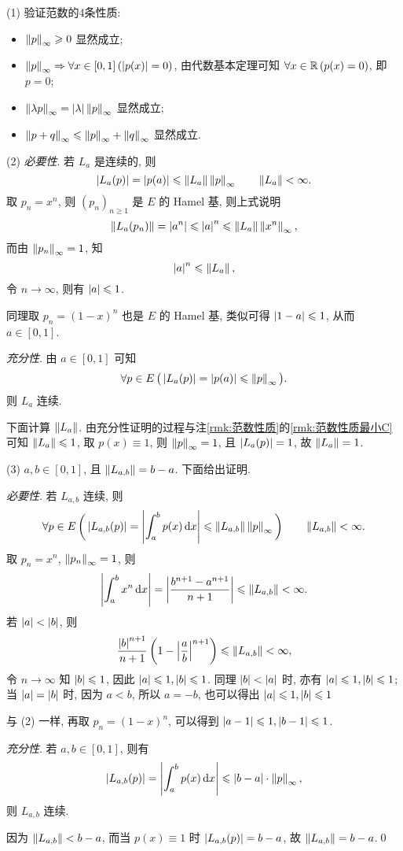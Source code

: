	\begin{Proof}
		(1) 验证范数的4条性质:
		\begin{itemize}
			\item $ \left\| p \right\|_{\infty}\geqslant 0 $ 显然成立;
			\item $ \left\| p \right\|_{\infty}\Rightarrow \forall x\in [0, 1]\,(\left| p(x) \right| =0) $, 由代数基本定理可知 $ \forall x\in\mathbb{R}\,(p(x)=0) $, 即 $ p=0 $;
			\item $ \left\| \lambda p \right\|_{\infty}=\left| \lambda \right| \left\| p \right\|_{\infty} $ 显然成立;
			\item $ \left\| p+q \right\|_{\infty}\leqslant\left\| p \right\|_{\infty}+\left\| q \right\|_{\infty} $ 显然成立.
		\end{itemize}

		(2) \textsl{必要性}. 若 $ L_{a} $ 是连续的, 则
		\[
			\left| L_{a}(p) \right| =\left| p(a) \right| \leqslant \left\| L_{a} \right\|\left\| p \right\|_{\infty}\qquad\left\| L_{a} \right\|<\infty.
		\]
		取 $ p_{n}=x^{n} $, 则 $ (p_{n})_{n\geqslant 1} $ 是 $ E $ 的 Hamel 基, 则上式说明
		\[
			\left\| L_{a}(p_{n}) \right\|=\left| a^{n} \right| \leqslant\left| a \right| ^{n}\leqslant \left\| L_{a} \right\|\left\| x^{n} \right\|_{\infty},
		\]
		而由 $ \left\| p_{n} \right\|_{\infty}=1 $, 知
		\[
			\left| a \right| ^{n}\leqslant\left\| L_{a} \right\|,
		\]
		令 $ n\to\infty $, 则有 $ \left| a \right| \leqslant1 $. 

		同理取 $ p_{n}=(1-x)^{n} $ 也是 $ E $ 的 Hamel 基, 类似可得 $ \left| 1-a \right| \leqslant1 $, 从而 $ a\in[0, 1] $.

		\textsl{充分性}. 由 $ a\in[0, 1] $ 可知
		\[
			\forall p\in E\,\big(\left| L_{a}(p) \right| =\left| p(a) \right| \leqslant\left\| p \right\|_{\infty}\big).
		\]
		则 $ L_{a} $ 连续.

		下面计算 $ \left\| L_{a} \right\| $. 由充分性证明的过程与注\ref{rmk:范数性质}的\ref{rmk:范数性质最小C}可知 $ \left\| L_{a} \right\|\leqslant1 $, 取 $ p(x)\equiv 1 $, 则 $ \left\| p \right\|_{\infty}=1 $, 且 $ \left| L_{a}(p) \right| =1 $, 故 $ \left\| L_{a} \right\|=1 $.

		(3) $ a, b\in[0, 1] $, 且 $ \left\| L_{a, b} \right\|=b-a $. 下面给出证明.

		\textsl{必要性}. 若 $ L_{a, b} $ 连续, 则
		\[
			\forall p\in E\,\bigg(\left| L_{a, b}(p) \right| =\left| \displaystyle\int_{a}^{b}p(x)\,\mathrm{d} x \right| \leqslant \left\| L_{a, b} \right\|\left\| p \right\|_{\infty}\bigg)\qquad \left\| L_{a, b} \right\|<\infty.
		\]
		取 $ p_{n}=x^{n} $, $ \left\| p_{n} \right\|_{\infty}=1 $, 则
		\[
			\left| \displaystyle\int_{a}^{b}x^{n}\,\mathrm{d} x \right| =\left| \frac{b^{n+1}-a^{n+1}}{n+1} \right| \leqslant\left\| L_{a, b} \right\|<\infty.
		\]
		若 $ \left| a \right| <\left| b \right|  $, 则
		\[
			\frac{\left| b \right| ^{n+1}}{n+1}\left( 1-\left| \frac{a}{b} \right| ^{n+1} \right) \leqslant \left\| L_{a, b} \right\|<\infty,
		\]
		令 $ n\to\infty $ 知 $ \left| b \right| \leqslant1 $, 因此 $ \left| a \right| \leqslant1, \left| b \right| \leqslant1 $. 同理 $ \left| b \right| <\left| a \right|  $ 时, 亦有 $ \left| a \right| \leqslant1, \left| b \right| \leqslant1 $; 当 $ \left| a \right| =\left| b \right|  $ 时, 因为 $ a<b $, 所以 $ a=-b $, 也可以得出 $ \left| a \right| \leqslant1, \left| b \right| \leqslant1 $

		与 (2) 一样, 再取 $ p_{n}=(1-x)^{n} $, 可以得到 $ \left| a-1 \right| \leqslant1, \left| b-1 \right| \leqslant1 $.

		\textsl{充分性}. 若 $ a, b\in[0, 1] $, 则有
		\[
			\left| L_{a, b}(p) \right| =\left| \int_{a}^{b}p(x)\,\mathrm{d} x \right| \leqslant \left| b-a \right| \cdot \left\| p \right\|_{\infty},
		\]
		则 $ L_{a, b} $ 连续. 

		因为 $ \left\| L_{a, b} \right\|<b-a $, 而当 $ p(x)\equiv 1 $ 时 $ \left| L_{a, b}(p) \right| =b-a $, 故 $ \left\| L_{a, b} \right\|=b-a $.\qed
	\end{Proof}

